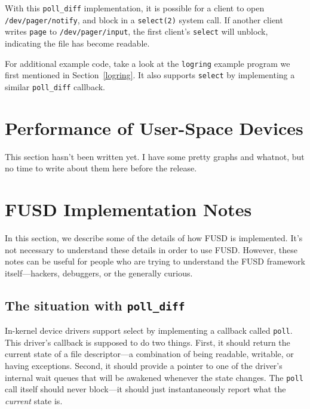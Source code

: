 \documentclass{article}
\begin{document}
With this {\tt poll\_diff} implementation, it is possible for a client
to open {\tt /dev/pager/notify}, and block in a {\tt select(2)} system
call.  If another client writes {\tt page} to {\tt /dev/pager/input},
the first client's {\tt select} will unblock, indicating the file has
become readable.

For additional example code, take a look at the {\tt logring} example
program we first mentioned in Section~\ref{logring}.  It also supports
{\tt select} by implementing a similar {\tt poll\_diff} callback.

\section{Performance of User-Space Devices}
\label{performance}

This section hasn't been written yet.  I have some pretty graphs and
whatnot, but no time to write about them here before the release.

\section{FUSD Implementation Notes}

In this section, we describe some of the details of how FUSD is
implemented.  It's not necessary to understand these details in order
to use FUSD.  However, these notes can be useful for people who are
trying to understand the FUSD framework itself---hackers, debuggers,
or the generally curious.

\subsection{The situation with {\tt poll\_diff}}
\label{poll-diff-implementation}


In-kernel device drivers support select by implementing a callback
called {\tt poll}.  This driver's callback is supposed to do two
things.  First, it should return the current state of a file
descriptor---a combination of being readable, writable, or having
exceptions.  Second, it should provide a pointer to one of the
driver's internal wait queues that will be awakened whenever the state
changes.  The {\tt poll} call itself should never block---it should
just instantaneously report what the {\em current} state is.
\end{document}
